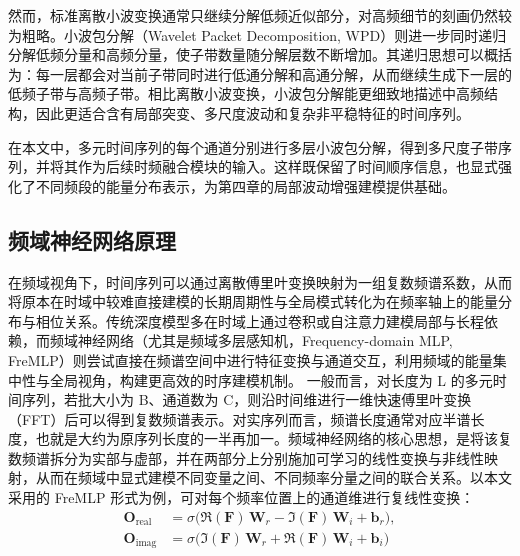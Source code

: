 然而，标准离散小波变换通常只继续分解低频近似部分，对高频细节的刻画仍然较为粗略。小波包分解（Wavelet Packet Decomposition, WPD）则进一步同时递归分解低频分量和高频分量，使子带数量随分解层数不断增加。其递归思想可以概括为：每一层都会对当前子带同时进行低通分解和高通分解，从而继续生成下一层的低频子带与高频子带。相比离散小波变换，小波包分解能更细致地描述中高频结构，因此更适合含有局部突变、多尺度波动和复杂非平稳特征的时间序列。

在本文中，多元时间序列的每个通道分别进行多层小波包分解，得到多尺度子带序列，并将其作为后续时频融合模块的输入。这样既保留了时间顺序信息，也显式强化了不同频段的能量分布表示，为第四章的局部波动增强建模提供基础。 \subsection{频域神经网络原理} 在频域视角下，时间序列可以通过离散傅里叶变换映射为一组复数频谱系数，从而将原本在时域中较难直接建模的长期周期性与全局模式转化为在频率轴上的能量分布与相位关系。传统深度模型多在时域上通过卷积或自注意力建模局部与长程依赖，而频域神经网络（尤其是频域多层感知机，Frequency-domain MLP, FreMLP）则尝试直接在频谱空间中进行特征变换与通道交互，利用频域的能量集中性与全局视角，构建更高效的时序建模机制。 一般而言，对长度为 L 的多元时间序列，若批大小为 B、通道数为 C，则沿时间维进行一维快速傅里叶变换（FFT）后可以得到复数频谱表示。对实序列而言，频谱长度通常对应半谱长度，也就是大约为原序列长度的一半再加一。频域神经网络的核心思想，是将该复数频谱拆分为实部与虚部，并在两部分上分别施加可学习的线性变换与非线性映射，从而在频域中显式建模不同变量之间、不同频率分量之间的联合关系。以本文采用的 FreMLP 形式为例，可对每个频率位置上的通道维进行复线性变换： \begin{equation}
\begin{aligned} \mathbf{O}_{\text{real}} &= \sigma\!\bigl(\Re(\mathbf{F})\,\mathbf{W}_r - \Im(\mathbf{F})\,\mathbf{W}_i + \mathbf{b}_r\bigr),\\ \mathbf{O}_{\text{imag}} &= \sigma\!\bigl(\Im(\mathbf{F})\,\mathbf{W}_r + \Re(\mathbf{F})\,\mathbf{W}_i + \mathbf{b}_i\bigr)
\end{aligned}
\label{eq:chap2-freq-complex-mlp}
\end{equation}
